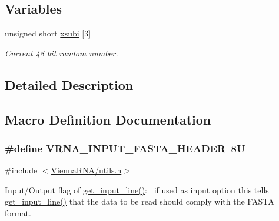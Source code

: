 \subsection*{Variables}
\begin{DoxyCompactItemize}
\item 
unsigned short \hyperlink{group__utils_gaf9a866c8417afda7368bbac939ab3c47}{xsubi} \mbox{[}3\mbox{]}
\begin{DoxyCompactList}\small\item\em Current 48 bit random number. \end{DoxyCompactList}\end{DoxyCompactItemize}


\subsection{Detailed Description}


\subsection{Macro Definition Documentation}
\hypertarget{group__utils_ga2f0d8069e93d3ac54d9320d6bdb8e7e7}{}
\subsubsection[{V\+R\+N\+A\+\_\+\+I\+N\+P\+U\+T\+\_\+\+F\+A\+S\+T\+A\+\_\+\+H\+E\+A\+D\+E\+R}]{\setlength{\rightskip}{0pt plus 5cm}\#define V\+R\+N\+A\+\_\+\+I\+N\+P\+U\+T\+\_\+\+F\+A\+S\+T\+A\+\_\+\+H\+E\+A\+D\+E\+R~8\+U}\label{group__utils_ga2f0d8069e93d3ac54d9320d6bdb8e7e7}


{\ttfamily \#include $<$\hyperlink{utils_8h}{Vienna\+R\+N\+A/utils.\+h}$>$}



Input/\+Output flag of \hyperlink{group__utils_ga8ef1835eb83f542396f59f0b205965e5}{get\+\_\+input\+\_\+line()}\+:~\newline
if used as input option this tells \hyperlink{group__utils_ga8ef1835eb83f542396f59f0b205965e5}{get\+\_\+input\+\_\+line()} that the data to be read should comply with the F\+A\+S\+T\+A format. 

